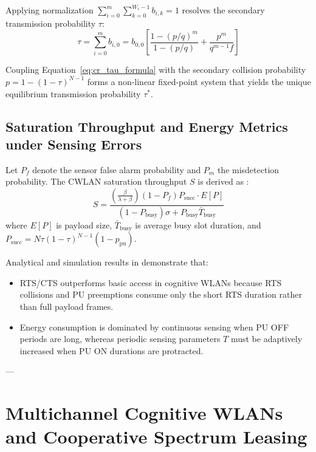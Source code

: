 Applying normalization $\sum_{i=0}^m \sum_{k=0}^{W_i - 1} b_{i, k} = 1$ resolves the secondary transmission probability $\tau$:
\begin{equation}
    \label{eq:cr_tau_formula}
    \tau = \sum_{i=0}^m b_{i, 0} = b_{0, 0} \left[ \frac{1 - (p/q)^m}{1 - (p/q)} + \frac{p^m}{q^{m-1} f} \right]
\end{equation}

Coupling Equation~\eqref{eq:cr_tau_formula} with the secondary collision probability $p = 1 - (1 - \tau)^{N - 1}$ forms a non-linear fixed-point system that yields the unique equilibrium transmission probability $\tau^*$.

\subsection{Saturation Throughput and Energy Metrics under Sensing Errors}
Let $P_f$ denote the sensor false alarm probability and $P_m$ the misdetection probability. The CWLAN saturation throughput $S$ is derived as \cite{dappuri2018cognitive}:
\begin{equation}
    \label{eq:cr_throughput_formula}
    S = \frac{\left( \frac{\beta}{\lambda + \beta} \right) (1 - P_f) P_{\mathrm{succ}} \cdot E[P]}{(1 - P_{\mathrm{busy}}) \sigma + P_{\mathrm{busy}} \bar{T}_{\mathrm{busy}}}
\end{equation}
where $E[P]$ is payload size, $\bar{T}_{\mathrm{busy}}$ is average busy slot duration, and $P_{\mathrm{succ}} = N \tau (1 - \tau)^{N-1} (1 - p_{\mathrm{pu}})$.

Analytical and simulation results in \cite{dappuri2018cognitive} demonstrate that:
\begin{itemize}
    \item RTS/CTS outperforms basic access in cognitive WLANs because RTS collisions and PU preemptions consume only the short RTS duration rather than full payload frames.
    \item Energy consumption is dominated by continuous sensing when PU OFF periods are long, whereas periodic sensing parameters $T$ must be adaptively increased when PU ON durations are protracted.
\end{itemize}

---

\section{Multichannel Cognitive WLANs and Cooperative Spectrum Leasing}
\label{sec:cr_multichannel}


